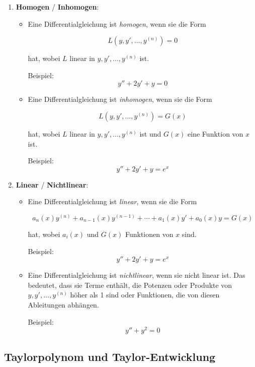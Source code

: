 \documentclass[11pt, openany]{book}
\begin{document}
\begin{enumerate}
    \item \textbf{Homogen} / \textbf{Inhomogen}:
    \begin{itemize}
        \item Eine Differentialgleichung ist \emph{homogen}, wenn sie die Form
        
        \[ L(y, y', \dots, y^{(n)}) = 0 \]
        
        hat, wobei $L$ linear in $y, y', \dots, y^{(n)}$ ist.
        
        Beispiel: \[ y'' + 2y' + y = 0 \]
        
        \item Eine Differentialgleichung ist \emph{inhomogen}, wenn sie die Form
        
        \[ L(y, y', \dots, y^{(n)}) = G(x) \]
        
        hat, wobei $L$ linear in $y, y', \dots, y^{(n)}$ ist und $G(x)$ eine Funktion von $x$ ist.
        
        Beispiel: \[ y'' + 2y' + y = e^x \]
    \end{itemize}

\newpage

    \item \textbf{Linear} / \textbf{Nichtlinear}:
    \begin{itemize}
        \item Eine Differentialgleichung ist \emph{linear}, wenn sie die Form
        
        \[ a_n(x) y^{(n)} + a_{n-1}(x) y^{(n-1)} + \cdots + a_1(x) y' + a_0(x) y = G(x) \]
        
        hat, wobei $a_i(x)$ und $G(x)$ Funktionen von $x$ sind.
        
        Beispiel: \[ y'' + 2y' + y = e^x \]
        
        \item Eine Differentialgleichung ist \emph{nichtlinear}, wenn sie nicht linear ist. Das bedeutet, dass sie Terme enthält, die Potenzen oder Produkte von $y, y', \dots, y^{(n)}$ höher als 1 sind oder Funktionen, die von diesen Ableitungen abhängen.
        
        Beispiel: \[ y'' + y^2 = 0 \]
    \end{itemize}
\end{enumerate}



\subsection{Taylorpolynom und Taylor-Entwicklung}
\end{document}
